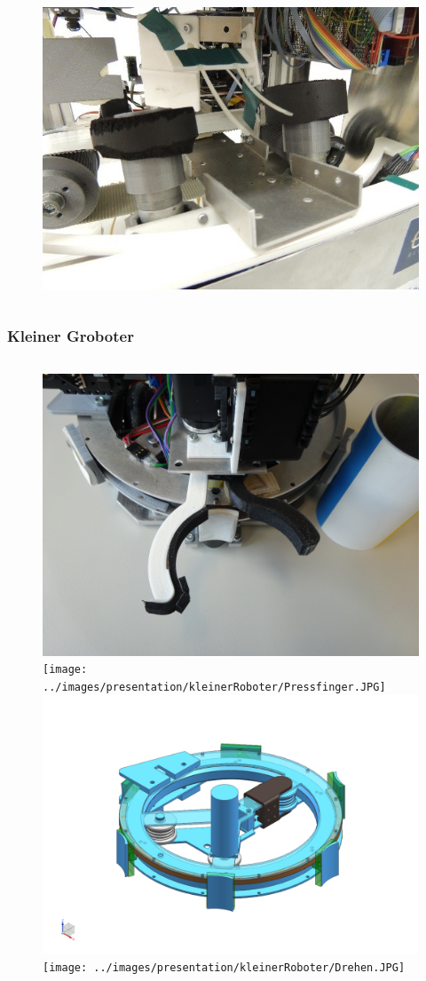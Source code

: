 \begin{frame}
\begin{figure}
\begin{columns}[t]
			\includegraphics[width = 0.6\columnwidth]{../images/presentation/schussmechanismus.jpg}\\		
		\end{columns}
	\end{figure}
\end{frame}


\begin{frame}
	\frametitle{Kleiner Groboter}
	\vspace{-1.5em}
	\begin{figure}
		\begin{columns}[t]
			\centering
			\includegraphics[width = 0.6\columnwidth] {../images/presentation/kleinerRoboter/Greifer.JPG}\\\vspace{1em}
			\texttt{[image: ../images/presentation/kleinerRoboter/Pressfinger.JPG]}\\
			\centering
			\includegraphics[width = 0.7\columnwidth]{../images/presentation/kleinerRoboter/Ring.png}\\\vspace{1em}
			\texttt{[image: ../images/presentation/kleinerRoboter/Drehen.JPG]}\\		
		\end{columns}
	\end{figure}
\end{frame}

